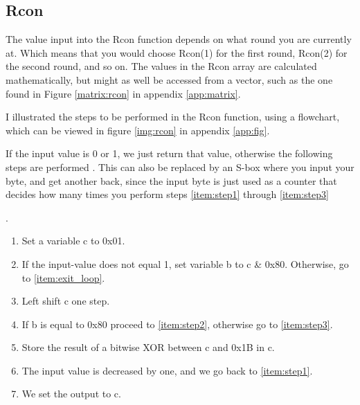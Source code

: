 \subsection{Rcon} \label{ch:Rcon}
The value input into the Rcon function depends on what round you are 
currently at. Which means that you would choose Rcon(1) for the first 
round, Rcon(2) for the second round, and so on. The values in the Rcon 
array are calculated mathematically, but might as well be accessed from 
a vector, such as the one found in Figure \ref{matrix:rcon} in 
appendix \ref{app:matrix}.

I illustrated the steps to be performed in the Rcon function, using a 
flowchart, which can be viewed in figure \ref{img:rcon} in appendix 
\ref{app:fig}.

If the input value is 0 or 1, we just return that value, otherwise the 
following steps are performed \citep{RijndaelKeySchedule}. This can 
also be replaced by an S-box where you input your byte, and get another 
back, since the input byte is just used as a counter that decides how 
many times you perform steps \ref{item:step1} through \ref{item:step3} 

.

\begin{enumerate}
\item Set a variable c to 0x01.
\item If the input-value does not equal 1, set variable b to c \& 0x80. 
  Otherwise, go to \ref{item:exit_loop}. 
  \label{item:step1}
\item Left shift c one step.
\item If b is equal to 0x80 proceed to \ref{item:step2}, otherwise go to
  \ref{item:step3}.
\item Store the result of a bitwise XOR between c and 0x1B in c.
  \label{item:step2}
\item The input value is decreased by one, and we go back to 
  \ref{item:step1}.
  \label{item:step3}
\item We set the output to c.
  \label{item:exit_loop}
\end{enumerate}
